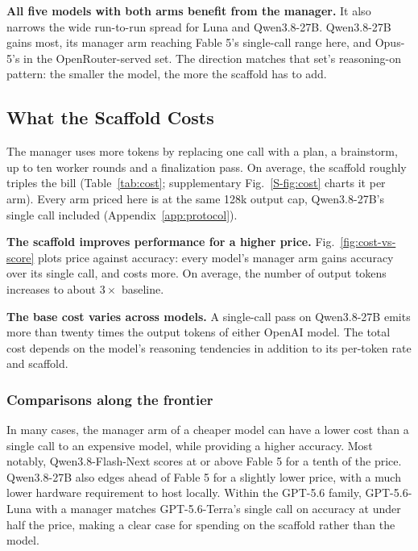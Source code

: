 \documentclass[journal]{IEEEtran}
\begin{document}
\textbf{All five models with both arms benefit from the manager.} It also narrows
the wide run-to-run spread for Luna and Qwen3.8-27B. Qwen3.8-27B gains most, its manager arm
reaching Fable 5's single-call range here, and Opus-5's in the OpenRouter-served set. The
direction matches that set's reasoning-on pattern: the smaller the model, the more the
scaffold has to add.

\subsection{What the Scaffold Costs}
\label{sec:cost}

The manager uses more tokens by replacing one call
with a plan, a brainstorm, up to ten worker rounds and a finalization pass. On average, the scaffold roughly triples the bill (Table~\ref{tab:cost}; supplementary Fig.~\ref{S-fig:cost} charts it per arm). Every arm
priced here is at the same 128k output cap, Qwen3.8-27B's single call included
(Appendix~\ref{app:protocol}).





\textbf{The scaffold improves performance for a higher price.}
Fig.~\ref{fig:cost-vs-score} plots price against accuracy: every model's manager arm gains accuracy over its single
call, and costs more. On average, the number of output tokens increases to about $3\times$ baseline.
 
\textbf{The base cost varies across models.} A single-call pass on Qwen3.8-27B emits more
than twenty times the output tokens of either OpenAI model. The total cost depends on the model's reasoning tendencies in addition to its per-token rate and scaffold.

\subsubsection{Comparisons along the frontier}
In many cases, the manager arm of a cheaper model can have a lower cost than a single call to an expensive model, while providing a higher accuracy. Most notably, Qwen3.8-Flash-Next scores at or above Fable 5 for a tenth of the price. Qwen3.8-27B also edges ahead of Fable 5 for a slightly lower price, with a much lower hardware requirement to host locally. Within the GPT-5.6 family, GPT-5.6-Luna with a manager matches GPT-5.6-Terra's single call on accuracy at under half the price, making a clear case for spending on the scaffold rather than the model.
\end{document}
